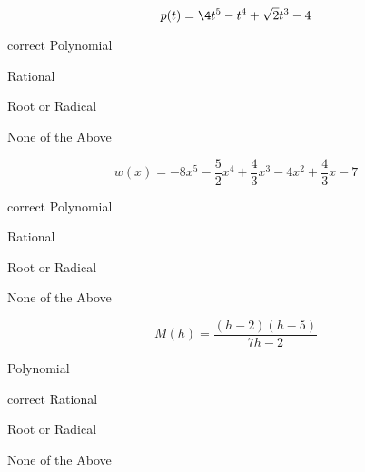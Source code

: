 \documentclass{ximera}
\begin{document}
\begin{exercise}
\begin{question}


\[
p(t) = \4t^5 - t^4 + \sqrt{2} t^3 - 4
\]

\begin{multipleChoice}
\item [correct]{Polynomial}
\item {Rational}
\item {Root or Radical}
\item {None of the Above}
\end{multipleChoice}


\end{question}












\begin{question}


\[
w(x) = -8x^5 - \frac{5}{2} x^4 + \frac{4}{3} x^3 - 4x^2 + \frac{4}{3} x - 7
\]

\begin{multipleChoice}
\item [correct]{Polynomial}
\item {Rational}
\item {Root or Radical}
\item {None of the Above}
\end{multipleChoice}


\end{question}











\begin{question}


\[
M(h) = \frac{(h-2)(h-5)}{7h - 2}
\]

\begin{multipleChoice}
\item {Polynomial}
\item [correct]{Rational}
\item {Root or Radical}
\item {None of the Above}
\end{multipleChoice}


\end{question}











\end{exercise}
\end{document}
